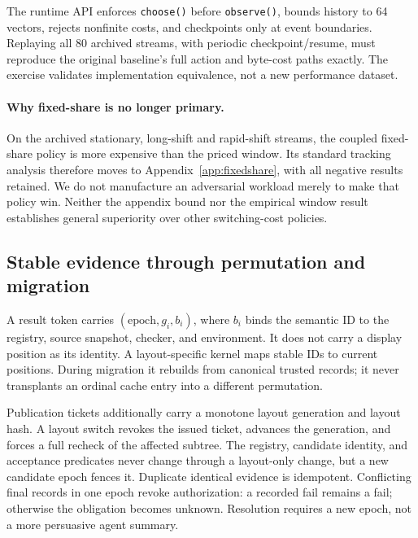 The runtime API enforces \texttt{choose()} before \texttt{observe()}, bounds
history to 64 vectors, rejects nonfinite costs, and checkpoints only at event
boundaries. Replaying all 80 archived streams, with periodic checkpoint/resume,
must reproduce the original baseline's full action and byte-cost paths exactly.
The exercise validates implementation equivalence, not a new performance dataset.

\paragraph{Why fixed-share is no longer primary.}
On the archived stationary, long-shift and rapid-shift streams, the coupled
fixed-share policy is more expensive than the priced window. Its standard
tracking analysis therefore moves to Appendix~\ref{app:fixedshare}, with all
negative results retained. We do not manufacture an adversarial workload merely
to make that policy win. Neither the appendix bound nor the empirical window
result establishes general superiority over other switching-cost policies.

\subsection{Stable evidence through permutation and migration}\label{sec:soundness}
A result token carries $(\text{epoch},g_i,b_i)$, where $b_i$ binds the semantic
ID to the registry, source snapshot, checker, and environment. It does not carry
a display position as its identity. A layout-specific kernel maps stable IDs
to current positions. During migration it rebuilds from canonical trusted records;
it never transplants an ordinal cache entry into a different permutation.

Publication tickets additionally carry a monotone layout generation and layout
hash. A layout switch revokes the issued ticket, advances the generation, and
forces a full recheck of the affected subtree. The registry, candidate identity,
and acceptance predicates never change through a layout-only
change, but a new candidate epoch fences it. Duplicate identical evidence is
idempotent. Conflicting final records in one epoch revoke authorization: a
recorded fail remains a fail; otherwise the obligation becomes unknown.
Resolution requires a new epoch, not a more persuasive agent summary.

